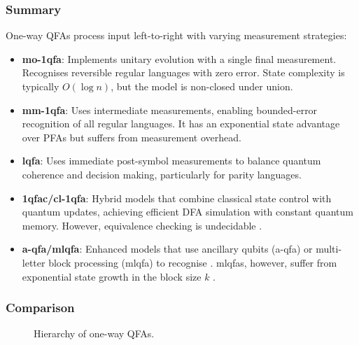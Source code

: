 \subsubsection{Summary}
One-way QFAs process input left-to-right with varying measurement strategies:
\begin{itemize}
    \item \textbf{\gls{mo-1qfa}}: Implements unitary evolution with a single final measurement. Recognises reversible regular languages with zero error. State complexity is typically $O(\log n)$, but the model is non-closed under union.
    \item \textbf{\gls{mm-1qfa}}: Uses intermediate measurements, enabling bounded-error recognition of all regular languages. It has an exponential state advantage over PFAs but suffers from measurement overhead.
    \item \textbf{\gls{lqfa}}: Uses immediate post-symbol measurements to balance quantum coherence and decision making, particularly for parity languages.
    \item \textbf{\gls{1qfac}/\gls{cl-1qfa}}: Hybrid models that combine classical state control with quantum updates, achieving efficient DFA simulation with constant quantum memory. However, equivalence checking is undecidable \cite{hirvensalo2008}.
    \item \textbf{\gls{a-qfa}/\gls{mlqfa}}: Enhanced models that use ancillary \glspl{qubit} (\gls{a-qfa}) or multi-letter block processing (\gls{mlqfa}) to recognise . \glspl{mlqfa}, however, suffer from exponential state growth in the block size $k$ \cite{ravikumar2003}.
\end{itemize}

\subsubsection{Comparison}
\begin{figure}[ht]
\centering
{}
\caption{Hierarchy of one-way QFAs.}
\label{fig:one_way_hierarchy}
\end{figure}

